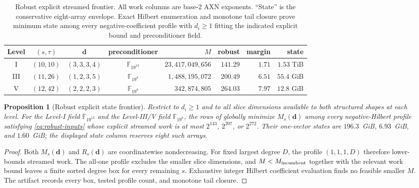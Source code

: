 \documentclass[11pt]{article}
\newtheorem{proposition}[proposition]{Proposition}
\newcommand{\F}{\mathbb F}
\begin{document}
\begin{table}[H]
\centering
\caption{Robust explicit streamed frontier.  All work columns are base-2 AXN
exponents.  ``State'' is the conservative eight-array envelope.  Exact
Hilbert enumeration and monotone tail closure prove minimum state among every
negative-coefficient profile with $d_i\ge1$ fitting the indicated explicit
bound and preconditioner field.}
\label{tab:robust-explicit}
\scriptsize
\setlength{\tabcolsep}{3.2pt}
\begin{tabular}{@{}c c c c r r r r@{}}
\toprule
Level & $(s,\tau)$ & $\mathbf d$ & preconditioner & $M$ & robust & margin & state\\
\midrule
I   & $(10,10)$ & $(3,3,3,4)$ & $\F_{19^{12}}$ & $23{,}417{,}049{,}656$ & $141.29$ & $1.71$ & $1.53$ TiB\\
III & $(11,26)$ & $(1,2,3,5)$ & $\F_{19^8}$ & $1{,}488{,}195{,}072$ & $200.49$ & $6.51$ & $55.4$ GiB\\
V   & $(12,42)$ & $(2,2,2,3)$ & $\F_{19^8}$ & $342{,}874{,}805$ & $264.03$ & $7.97$ & $12.8$ GiB\\
\bottomrule
\end{tabular}
\end{table}

\begin{proposition}[Robust explicit state frontier]
\label{prop:robust-explicit-frontier}
Restrict to $d_i\ge1$ and to all slice dimensions available to both structured
shapes at each level.  For the Level-I field $\F_{19^{12}}$ and the Level-III/V
field $\F_{19^8}$, the rows of  globally minimize
$M_s(\mathbf d)$ among every negative-Hilbert profile satisfying
\eqref{eq:robust-inputs} whose explicit streamed work is at most
$2^{143}$, $2^{207}$, or $2^{272}$.  Their one-vector states are
$196.3$~GiB, $6.93$~GiB, and $1.60$~GiB; the displayed state column reserves
eight such arrays.
\end{proposition}

\begin{proof}
Both $M_s(\mathbf d)$ and $R_s(\mathbf d)$ are coordinatewise nondecreasing.
For fixed largest degree $D$, the profile $(1,1,1,D)$ therefore lower-bounds
streamed work.  The all-one profile excludes the smaller slice dimensions, and
$M<M_{\rm incumbent}$ together with the relevant work bound leaves a finite
sorted degree box for every remaining $s$.  Exhaustive integer Hilbert
coefficient evaluation finds no feasible smaller $M$.  The artifact records
every box, tested profile count, and monotone tail closure.
\end{proof}
\end{document}
